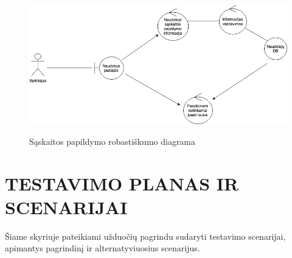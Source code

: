 \documentclass{VUMIFPSkursinis}
\begin{document}
		\begin{figure}[H]
		\centering
		\includegraphics[width=\linewidth]{img/saskaita.png}
		\label{fig:sask}
		\caption{Sąskaitos papildymo robastiškumo diagrama}
	\end{figure}

	\newpage

	\section{TESTAVIMO PLANAS IR SCENARIJAI}
	Šiame skyriuje pateikiami užduočių pagrindu sudaryti testavimo scenarijai, apimantys pagrindinį ir alternatyviuosius scenarijus.
\end{document}
